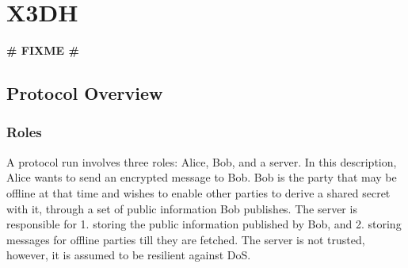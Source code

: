 \chapter{X3DH}
\textbf{\LARGE \# FIXME \#}
\label{ch:x3dh}

\section{Protocol Overview}
\subsection{Roles}
A protocol run involves three roles: Alice, Bob, and a server. In this description, Alice wants to send an encrypted message to Bob. Bob is the party that may be offline at that time and wishes to enable other parties to derive a shared secret with it, through a set of public information Bob publishes. The server is responsible for 1. storing the public information published by Bob, and 2. storing messages for offline parties till they are fetched. The server is not trusted, however, it is assumed to be resilient against DoS. %
